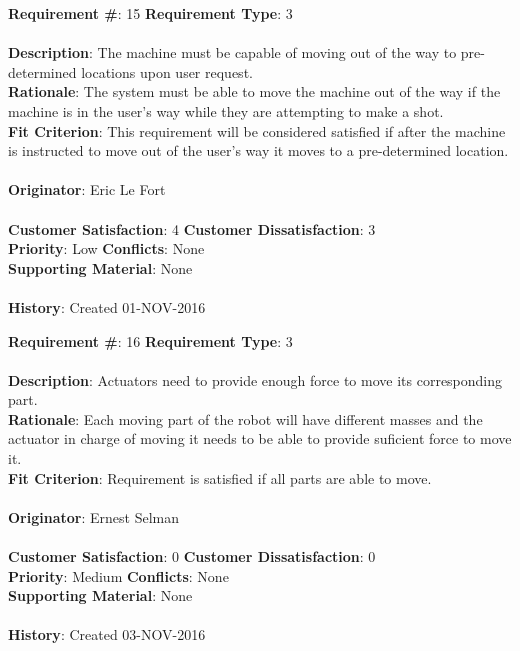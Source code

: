 \documentclass[titlepage]{article}
\begin{document}
\begin{framed}
	\noindent\textbf{Requirement \#}: 15 \hfill \textbf{Requirement Type}: 3 \hfill\\\\
	\noindent\textbf{Description}: The machine must be capable of moving out of the way to pre-determined locations upon user request.\\
	\textbf{Rationale}: The system must be able to move the machine out of the way if the machine is in the user's way while they are attempting to make a shot.\\
	\textbf{Fit Criterion}: This requirement will be considered satisfied if after the machine is instructed to move out of the user's way it moves to a pre-determined location.\\\\
	\textbf{Originator}: Eric Le Fort\\\\
	\noindent\textbf{Customer Satisfaction}: 4 \hfill 	\textbf{Customer Dissatisfaction}: 3 \hfill\\
	\textbf{Priority}: Low \hfill \textbf{Conflicts}: None \hfill\\
	\textbf{Supporting Material}: None\\\\
	\noindent\textbf{History}: Created 01-NOV-2016
\end{framed}

\begin{framed}
	\noindent\textbf{Requirement \#}: 16 \hfill \textbf{Requirement Type}: 3 \hfill\\\\
	\noindent\textbf{Description}: Actuators need to provide enough force to move its corresponding part. \\
	\textbf{Rationale}: Each moving part of the robot will have different masses and the actuator in charge of moving it needs to be able to provide suficient force to move it. \\
	\textbf{Fit Criterion}: Requirement is satisfied if all parts are able to move. \\\\
	\textbf{Originator}: Ernest Selman\\\\
	\noindent\textbf{Customer Satisfaction}: 0 \hfill 	\textbf{Customer Dissatisfaction}: 0 \hfill\\
	\textbf{Priority}: Medium \hfill \textbf{Conflicts}: None \hfill\\
	\textbf{Supporting Material}: None\\\\
	\noindent\textbf{History}: Created 03-NOV-2016
\end{framed}
\end{document}
